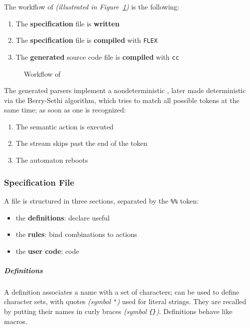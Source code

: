 \documentclass[english]{article}
\begin{document}
The workflow of \flex \textit{(illustrated in Figure~\ref{fig:flex-workflow})} is the following:

\begin{enumerate}
  \item The \textbf{specification} file is \textbf{written}
  \item The \textbf{specification} file is \textbf{compiled} with \texttt{FLEX}
  \item The \textbf{generated} \clang source code file is \textbf{compiled} with \texttt{cc}
\end{enumerate}

\begin{figure}[htbp]
  \centering
  \bigskip
  \caption{Workflow of \flex}
  \label{fig:flex-workflow}
  \bigskip
\end{figure}

The generated parsers implement a nondeterministic \FSA, later made deterministic via the Berry-Sethi algorithm, which tries to match all possible tokens at the same time;
as soon as one is recognized:

\begin{enumerate}
  \item The semantic action is executed
  \item The stream skips past the end of the token
  \item The automaton reboots
\end{enumerate}

\subsubsection{Specification File}

A \flex file is structured in three sections, separated by the \texttt{\%\%} token:

\begin{itemize}
  \item the \textbf{definitions}: declare useful \re
  \item the \textbf{rules}: bind \re combinations to actions
  \item the \textbf{user code}: \clang code
\end{itemize}

\subparagraph*{Definitions}
A definition associates a name with a set of characters;
\re can be used to define character sets, with quotes \textit{(symbol \texttt{"})} used for literal strings.
They are recalled by putting their names in curly braces \textit{(symbol \texttt{\{\}})}.
Definitions behave like \clang macros.
\end{document}

